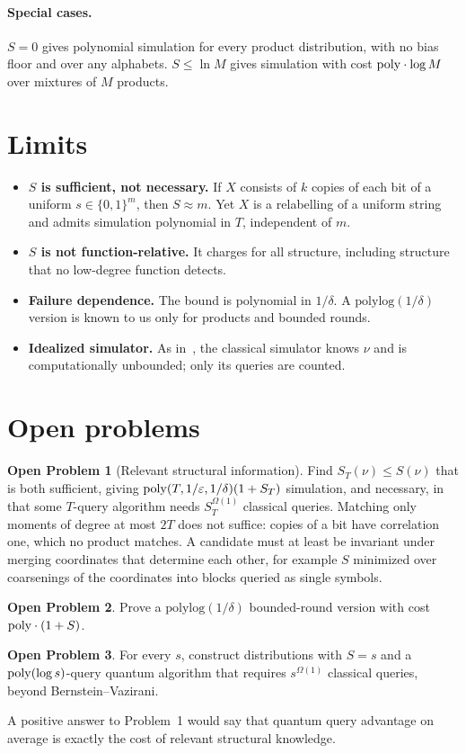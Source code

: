 \documentclass[11pt]{article}
\theoremstyle{definition}\newtheorem{definition}[theorem]{Definition}\newtheorem{problem}{Open Problem}
\theoremstyle{remark}\newtheorem{remark}[theorem]{Remark}
\begin{document}
\paragraph{Special cases.} $S=0$ gives polynomial simulation for every product distribution, with no bias floor and over any alphabets. $S\le\ln M$ gives simulation with cost $\mathrm{poly}\cdot\log M$ over mixtures of $M$ products.

\section{Limits}
\begin{itemize}[nosep]
\item \textbf{$S$ is sufficient, not necessary.} If $X$ consists of $k$ copies of each bit of a uniform $s\in\{0,1\}^m$, then $S\approx m$. Yet $X$ is a relabelling of a uniform string and admits simulation polynomial in $T$, independent of $m$.
\item \textbf{$S$ is not function-relative.} It charges for all structure, including structure that no low-degree function detects.
\item \textbf{Failure dependence.} The bound is polynomial in $1/\delta$. A $\mathrm{polylog}(1/\delta)$ version is known to us only for products and bounded rounds.
\item \textbf{Idealized simulator.} As in~\cite{AA14,GMNR26}, the classical simulator knows $\nu$ and is computationally unbounded; only its queries are counted.
\end{itemize}

\section{Open problems}
\begin{problem}[Relevant structural information]
Find $S_T(\nu)\le S(\nu)$ that is both sufficient, giving $\mathrm{poly}(T,1/\varepsilon,1/\delta)(1+S_T)$ simulation, and necessary, in that some $T$-query algorithm needs $S_T^{\Omega(1)}$ classical queries. Matching only moments of degree at most $2T$ does not suffice: copies of a bit have correlation one, which no product matches. A candidate must at least be invariant under merging coordinates that determine each other, for example $S$ minimized over coarsenings of the coordinates into blocks queried as single symbols.
\end{problem}
\begin{problem}Prove a $\mathrm{polylog}(1/\delta)$ bounded-round version with cost $\mathrm{poly}\cdot(1+S)$.\end{problem}
\begin{problem}For every $s$, construct distributions with $S=s$ and a $\mathrm{poly}(\log s)$-query quantum algorithm that requires $s^{\Omega(1)}$ classical queries, beyond Bernstein--Vazirani.\end{problem}
A positive answer to Problem~1 would say that quantum query advantage on average is exactly the cost of relevant structural knowledge.
\end{document}

